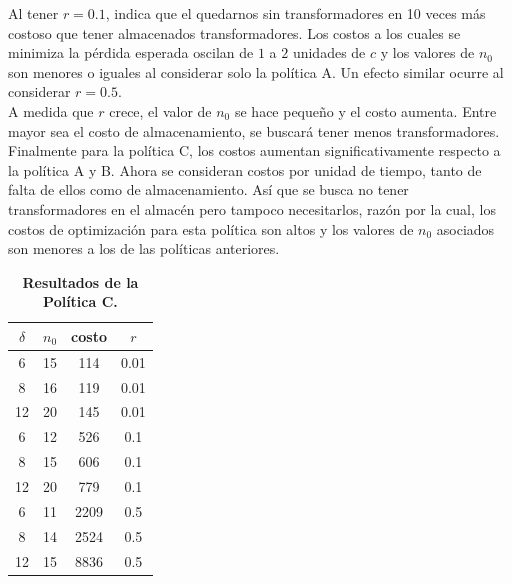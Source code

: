 \noindent Al tener $r=0.1$, indica que el quedarnos sin transformadores en 10 veces m\'as costoso que tener almacenados transformadores. Los costos a los cuales se minimiza la p\'erdida esperada oscilan de $1$ a $2$ unidades de $c$ y los valores de $n_0$ son menores o iguales al considerar solo la pol\'itica A. Un efecto similar ocurre al considerar $r=0.5$. \\[0.1cm]
 A medida que $r$ crece, el valor de $n_0$ se hace peque\~no y el costo aumenta. Entre mayor sea el costo de almacenamiento, se buscar\'a tener menos transformadores.\\[0.2cm]
Finalmente para la pol\'itica C, los costos aumentan significativamente respecto a la pol\'itica A y B. Ahora se consideran costos por unidad de tiempo, tanto de falta de ellos como de almacenamiento. As\'i que se busca no  tener transformadores en el almac\'en pero tampoco necesitarlos, raz\'on por la cual, los costos   de optimizaci\'on para esta pol\'itica son altos y los valores de $n_0$ asociados son menores a los de las pol\'iticas anteriores.
\begin{table}[h!]\small
\begin{center}
\caption{\bf Resultados de la Pol\'itica C.}\label{resuFF}
\vspace{0.3cm}\begin{tabular}{cccc}
\toprule[0.6mm]
 $\delta$ & $n_0$  & costo& $r$\\
\toprule[0.6mm]
  6   & 15 & 114& 0.01\\
  8   & 16 & 119& 0.01\\
  12 & 20  & 145 & 0.01\\
  \hline
  6   & 12 & 526& 0.1\\
  8   & 15 & 606& 0.1\\
  12 & 20 & 779& 0.1\\
  \hline
  6   & 11& 2209&0.5 \\
  8   & 14&2524 & 0.5 \\
  12 & 15 &8836 &0.5\\
\toprule[0.6mm]
\end{tabular}
\end{center}

\end{table}


